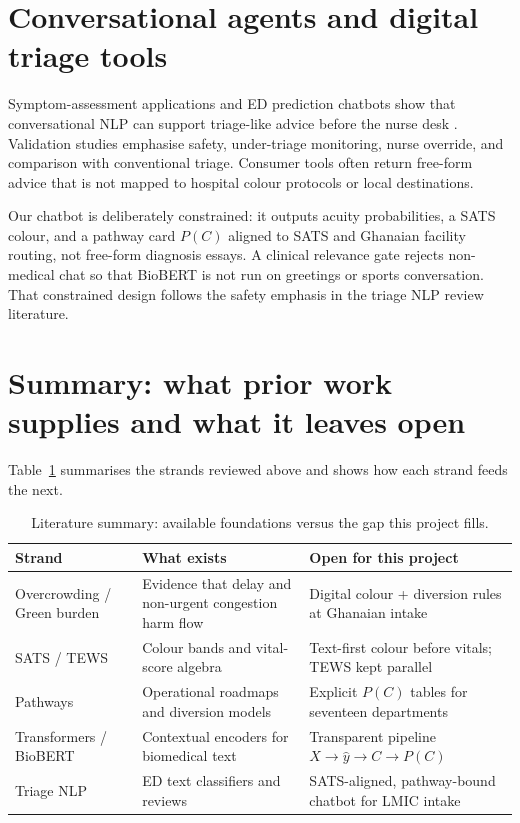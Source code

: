 \section{Conversational agents and digital triage tools}

Symptom-assessment applications and ED prediction chatbots show that conversational NLP can support triage-like advice before the nurse desk \citep{stewart2023nlp}. Validation studies emphasise safety, under-triage monitoring, nurse override, and comparison with conventional triage. Consumer tools often return free-form advice that is not mapped to hospital colour protocols or local destinations.

Our chatbot is deliberately constrained: it outputs acuity probabilities, a SATS colour, and a pathway card \(P(C)\) aligned to SATS and Ghanaian facility routing, not free-form diagnosis essays. A clinical relevance gate rejects non-medical chat so that BioBERT is not run on greetings or sports conversation. That constrained design follows the safety emphasis in the triage NLP review literature.

\section{Summary: what prior work supplies and what it leaves open}

Table~\ref{tab:lit-synthesis} summarises the strands reviewed above and shows how each strand feeds the next.

\begin{table}[H]
\centering
\small
\begin{tabular}{|p{3.2cm}|p{5.5cm}|p{4.5cm}|}
\hline
\textbf{Strand} & \textbf{What exists} & \textbf{Open for this project} \\
\hline
Overcrowding / Green burden & Evidence that delay and non-urgent congestion harm flow \citep{Mitchell2023,Yilmaz2021} & Digital colour + diversion rules at Ghanaian intake \\
SATS / TEWS & Colour bands and vital-score algebra \citep{satsmanual,Rominski2014} & Text-first colour before vitals; TEWS kept parallel \\
Pathways & Operational roadmaps and diversion models \citep{Sundstrom2014} & Explicit \(P(C)\) tables for seventeen departments \\
Transformers / BioBERT & Contextual encoders for biomedical text \citep{vaswani2017attention,devlin2019bert,lee2020biobert} & Transparent pipeline \(X\to\hat y\to C\to P(C)\) \\
Triage NLP & ED text classifiers and reviews \citep{stewart2023nlp,gligorijevic2018deep} & SATS-aligned, pathway-bound chatbot for LMIC intake \\
\hline
\end{tabular}
\caption{Literature summary: available foundations versus the gap this project fills.}
\label{tab:lit-synthesis}
\end{table}

